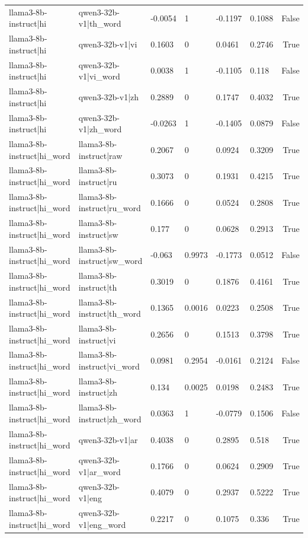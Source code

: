 \begin{table}
\begin{tabular}{llllllr}
llama3-8b-instruct|hi & qwen3-32b-v1|th_word & -0.0054 & 1 & -0.1197 & 0.1088 & False \\
llama3-8b-instruct|hi & qwen3-32b-v1|vi & 0.1603 & 0 & 0.0461 & 0.2746 & True \\
llama3-8b-instruct|hi & qwen3-32b-v1|vi_word & 0.0038 & 1 & -0.1105 & 0.118 & False \\
llama3-8b-instruct|hi & qwen3-32b-v1|zh & 0.2889 & 0 & 0.1747 & 0.4032 & True \\
llama3-8b-instruct|hi & qwen3-32b-v1|zh_word & -0.0263 & 1 & -0.1405 & 0.0879 & False \\
llama3-8b-instruct|hi_word & llama3-8b-instruct|raw & 0.2067 & 0 & 0.0924 & 0.3209 & True \\
llama3-8b-instruct|hi_word & llama3-8b-instruct|ru & 0.3073 & 0 & 0.1931 & 0.4215 & True \\
llama3-8b-instruct|hi_word & llama3-8b-instruct|ru_word & 0.1666 & 0 & 0.0524 & 0.2808 & True \\
llama3-8b-instruct|hi_word & llama3-8b-instruct|sw & 0.177 & 0 & 0.0628 & 0.2913 & True \\
llama3-8b-instruct|hi_word & llama3-8b-instruct|sw_word & -0.063 & 0.9973 & -0.1773 & 0.0512 & False \\
llama3-8b-instruct|hi_word & llama3-8b-instruct|th & 0.3019 & 0 & 0.1876 & 0.4161 & True \\
llama3-8b-instruct|hi_word & llama3-8b-instruct|th_word & 0.1365 & 0.0016 & 0.0223 & 0.2508 & True \\
llama3-8b-instruct|hi_word & llama3-8b-instruct|vi & 0.2656 & 0 & 0.1513 & 0.3798 & True \\
llama3-8b-instruct|hi_word & llama3-8b-instruct|vi_word & 0.0981 & 0.2954 & -0.0161 & 0.2124 & False \\
llama3-8b-instruct|hi_word & llama3-8b-instruct|zh & 0.134 & 0.0025 & 0.0198 & 0.2483 & True \\
llama3-8b-instruct|hi_word & llama3-8b-instruct|zh_word & 0.0363 & 1 & -0.0779 & 0.1506 & False \\
llama3-8b-instruct|hi_word & qwen3-32b-v1|ar & 0.4038 & 0 & 0.2895 & 0.518 & True \\
llama3-8b-instruct|hi_word & qwen3-32b-v1|ar_word & 0.1766 & 0 & 0.0624 & 0.2909 & True \\
llama3-8b-instruct|hi_word & qwen3-32b-v1|eng & 0.4079 & 0 & 0.2937 & 0.5222 & True \\
llama3-8b-instruct|hi_word & qwen3-32b-v1|eng_word & 0.2217 & 0 & 0.1075 & 0.336 & True \\

\end{tabular}
\end{table}
